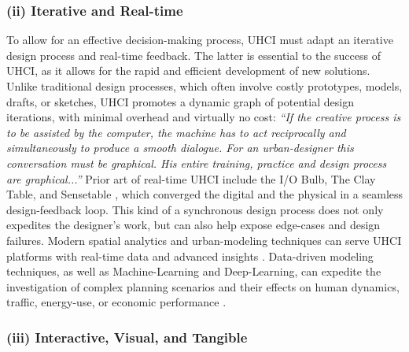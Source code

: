 {{    }

    \subsubsection{(ii) Iterative and Real-time}
    {
        To allow for an effective decision-making process, UHCI must adapt an iterative design process and real-time feedback. The latter is essential to the success of UHCI, as it allows for the rapid and efficient development of new solutions. Unlike traditional design processes, which often involve costly prototypes, models, drafts, or sketches, UHCI promotes a dynamic graph of potential design iterations, with minimal overhead and virtually no cost: \textit{``If the creative process is to be assisted by the computer, the machine has to act reciprocally and simultaneously to produce a smooth dialogue. For an urban-designer this conversation must be graphical. His entire training, practice and design process are graphical...''} \cite{Infoscapes} Prior art of real-time UHCI include the I/O Bulb, The Clay Table, and Sensetable \cite{Ishii2004, Ishii2002, Ishii2008}, which converged the digital and the physical in a seamless design-feedback loop. This kind of a synchronous design process does not only expedites the designer's work, but can also help expose edge-cases and design failures. Modern spatial analytics and urban-modeling techniques can serve UHCI platforms with real-time data and advanced insights \cite{Kitchin2014, salganik_bit_2017}. Data-driven modeling techniques, as well as Machine-Learning and Deep-Learning, can expedite the investigation of complex planning scenarios and their effects on human dynamics, traffic, energy-use, or economic performance \cite{Foth2011, doorley2019s, noyman2020deepscope}.
    }

    \subsubsection{(iii) Interactive, Visual, and Tangible}

}
